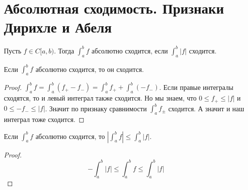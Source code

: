 \section{Абсолютная сходимость. Признаки Дирихле и Абеля}
\begin{conj}
    Пусть $f \in C[a, b)$. Тогда $\int_{a}^{b} f$ абсолютно сходится, если $\int_{a}^{b} |f|$ сходится.
  \end{conj}
  
  \begin{theorem}
    Если $\int_{a}^{b} f$ абсолютно сходится, то он сходится.
  \end{theorem}
  \begin{proof}
    $\int_{a}^{b} f = \int_{a}^{b}(f_+ - f_-) = \int_{a}^{b} f_+ + \int_{a}^{b} (-f_-)$. Если правые интегралы сходятся, то и левый интеграл также сходится. Но мы знаем, что $0 \leq f_+ \leq |f|$ и $0 \leq -f_- \leq |f|$. Значит по признаку сравнимости $\int_{a}^{b} f_{\pm}$ сходится. А значит и наш интеграл тоже сходится.
  \end{proof}
  
  \begin{notice}
    Если $\int_{a}^{b} f$ абсолютно сходится, то $\left | \int_{a}^{b} f \right | \leq \int_{a}^{b} |f|$.
  \end{notice}
  \begin{proof}
    \begin{equation*}
      -\int_{a}^{b} |f| \leq \int_{a}^{b} f \leq \int_{a}^{b} |f|
    \end{equation*}
  \end{proof}
  
